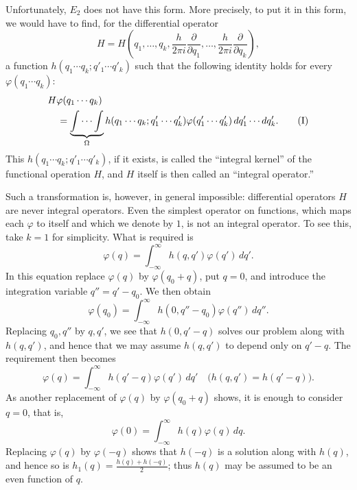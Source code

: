 \documentclass[fontsize=13pt,twoside,openany,headings=normal,parskip=false,bookmarkpackage=false,DIV=calc]{scrbook}
\begin{document}
Unfortunately, \hyperref[eq:I.3.E2]{$E_2$} does not have this form. More precisely, to put it in this form, we would have to find, for the differential operator
\[
 H=H\left(q_1,\ldots,q_k,\frac{h}{2\pi i}\frac{\partial}{\partial q_1},
 \ldots,\frac{h}{2\pi i}\frac{\partial}{\partial q_k}\right),
\]
a function $h(q_1\cdots q_k;q'_1\cdots q'_k)$ such that the following identity holds for every $\varphi(q_1\cdots q_k)$:
\begin{align}
 &H\varphi(q_1\cdots q_k)\notag\\
 &\quad=\underbrace{\int\cdots\int}_{\Omega} h(q_1\cdots q_k;q'_1\cdots q'_k)
 \varphi(q'_1\cdots q'_k)\,dq'_1\cdots dq'_k.
 \tag{I}\label{eq:I.3.I}
\end{align}
This $h(q_1\cdots q_k;q'_1\cdots q'_k)$, if it exists, is called the ``integral kernel'' of the functional operation $H$, and $H$ itself is then called an ``integral operator.''

Such a transformation is, however, in general impossible: differential operators $H$ are never integral operators. Even the simplest operator on functions, which maps each $\varphi$ to itself and which we denote by $1$, is not an integral operator. To see this, take $k=1$ for simplicity. What is required is
\begin{equation}
 \varphi(q)=\int_{-\infty}^{\infty}h(q,q')\varphi(q')\,dq'.
 \tag{$\Delta_1$}\label{eq:I.3.D1}
\end{equation}
In this equation replace $\varphi(q)$ by $\varphi(q_0+q)$, put $q=0$, and introduce the integration variable $q''=q'-q_0$. We then obtain
\[
 \varphi(q_0)=\int_{-\infty}^{\infty}h(0,q''-q_0)\varphi(q'')\,dq''.
\]
Replacing $q_0,q''$ by $q,q'$, we see that $h(0,q'-q)$ solves our problem along with $h(q,q')$, and hence that we may assume $h(q,q')$ to depend only on $q'-q$. The requirement then becomes
\begin{equation}
 \varphi(q)=\int_{-\infty}^{\infty}h(q'-q)\varphi(q')\,dq'
 \quad\bigl(h(q,q')=h(q'-q)\bigr).
 \tag{$\Delta_2$}\label{eq:I.3.D2}
\end{equation}
As another replacement of $\varphi(q)$ by $\varphi(q_0+q)$ shows, it is enough to consider $q=0$, that is,
\begin{equation}
 \varphi(0)=\int_{-\infty}^{\infty}h(q)\varphi(q)\,dq.
 \tag{$\Delta_3$}\label{eq:I.3.D3}
\end{equation}
Replacing $\varphi(q)$ by $\varphi(-q)$ shows that $h(-q)$ is a solution along with $h(q)$, and hence so is $h_1(q)=\frac{h(q)+h(-q)}2$; thus $h(q)$ may be assumed to be an even function of $q$.
\end{document}
